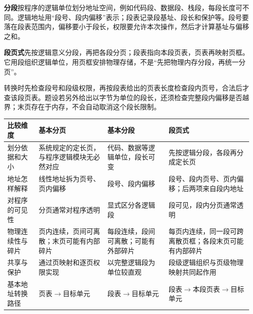 \textbf{分段}按程序的逻辑单位划分地址空间，例如代码段、数据段、栈段，每段长度可不同。逻辑地址用``段号、段内偏移''表示；段表记录段基址、段长和保护等。段号要落在段表范围内，偏移要小于段长，权限要允许本次操作，然后才计算基址与偏移之和。

\textbf{段页式}先按逻辑意义分段，再把各段分页；段表指向本段页表，页表再映射页框。它用段组织逻辑单位，用页框安排物理存储，不是``先把物理内存分段，再统一分页''。

转换时先检查段号和段级权限，再按段表给出的页表长度检查段内页号，合法后才查该段页表。题设若另外给出以字节为单位的段长，还须检查完整段内偏移是否越界；末页存在于内存，不会自动取消这个段长限制。

\begin{wideblock}

\par\medskip\noindent\begin{minipage}{\linewidth}\fontsize{9.3}{12}\selectfont\begin{tabularx}{\linewidth}{@{}YYYY@{}}
\toprule\noalign{}
\begin{minipage}[b]{\linewidth}\raggedright
比较维度
\end{minipage} & \begin{minipage}[b]{\linewidth}\raggedright
基本分页
\end{minipage} & \begin{minipage}[b]{\linewidth}\raggedright
基本分段
\end{minipage} & \begin{minipage}[b]{\linewidth}\raggedright
段页式
\end{minipage} \\
\midrule\noalign{}


划分依据和大小 & 系统规定的定长页，与程序逻辑模块无必然对应 & 代码、数据等逻辑单位，段长可变 & 先按逻辑分段，各段再分成定长页 \\
地址怎样解释 & 线性地址拆为页号、页内偏移 & 段号、段内偏移 & 段号、段内页号、页内偏移；后两项来自段内地址 \\
对程序的可见性 & 分页通常对程序透明 & 显式区分各逻辑段 & 段可见，段内分页通常透明 \\
物理连续性与碎片 & 页内连续，页间可离散；末页可能有内部碎片 & 每段连续，段间可离散；可能有外部碎片 & 每页内连续，同一段可跨离散页框；各段末页可能有内部碎片 \\
共享与保护 & 通过页映射和逐页权限实现 & 以完整逻辑段为单位较直观 & 段级逻辑组织与页级物理映射共同起作用 \\
基本地址转换路径 & 页表\ensuremath{\to}目标单元 & 段表\ensuremath{\to}目标单元 & 段表\ensuremath{\to}本段页表\ensuremath{\to}目标单元 \\
\bottomrule\end{tabularx}
\end{minipage}\par\medskip

\end{wideblock}

